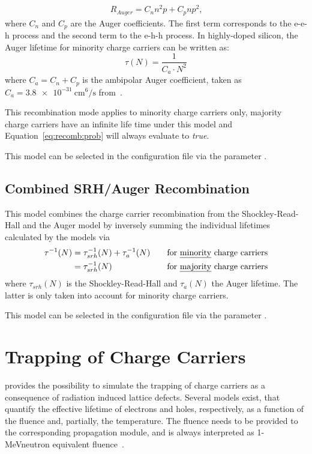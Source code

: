 \begin{align*}
	R_{Auger} = C_n n^2p + C_p n p^2\textrm{,}
\end{align*}
where $C_n$ and $C_p$ are the Auger coefficients.
The first term corresponds to the e-e-h process and the second term to the e-h-h process.
In highly-doped silicon, the Auger lifetime for minority charge carriers can be written as:
\begin{equation}
    \tau(N) = \frac{1}{C_{a} \cdot N^2}
\end{equation}
where $C_{a} = C_{n} + C_{p}$ is the ambipolar Auger coefficient, taken as $C_{a} = \SI{3.8e-31}{\cm^6 \per \s}$ from~\cite{dziewior}.

This recombination mode applies to minority charge carriers only, majority charge carriers have an infinite life time under this model and Equation~\eqref{eq:recomb:prob} will always evaluate to \emph{true}.

This model can be selected in the configuration file via the parameter .

\subsection{Combined SRH/Auger Recombination}

This model combines the charge carrier recombination from the Shockley-Read-Hall and the Auger model by inversely summing the individual lifetimes calculated by the models via
\begin{align}
    \label{eq:recom:combined}
    \tau^{-1}(N) &= \tau_{srh}^{-1}(N) + \tau_{a}^{-1}(N) &\quad \textrm{for \emph{minority} charge carriers} \nonumber \\
              &= \tau_{srh}^{-1}(N) &\quad \textrm{for \emph{majority} charge carriers}
\end{align}
where $\tau_{srh}(N)$ is the Shockley-Read-Hall and $\tau_{a}(N)$ the Auger lifetime.
The latter is only taken into account for minority charge carriers.

This model can be selected in the configuration file via the parameter .


\section{Trapping of Charge Carriers}
\label{sec:trapping}

\apsq provides the possibility to simulate the trapping of charge carriers as a consequence of radiation induced lattice defects.
Several models exist, that quantify the effective lifetime of electrons and holes, respectively, as a function of the fluence and, partially, the temperature.
The fluence needs to be provided to the corresponding propagation module, and is always interpreted as 1-MeVneutron equivalent fluence~\cite{niel}.

